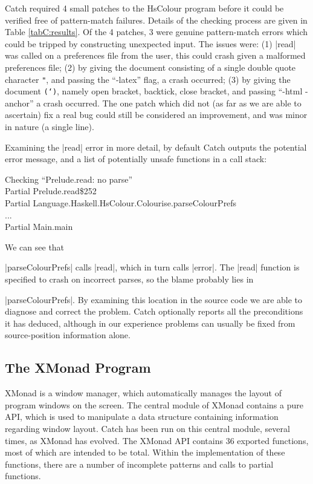 Catch required 4 small patches to the HsColour program before it could be verified free of pattern-match failures. Details of the checking process are given in Table \ref{tabC:results}. Of the 4 patches, 3 were genuine pattern-match errors which could be tripped by constructing unexpected input. The issues were: (1) |read| was called on a preferences file from the user, this could crash given a malformed preferences file; (2) by giving the document consisting of a single double quote character \texttt{"}, and passing the ``-latex'' flag, a crash occurred; (3) by giving the document \texttt{(`)}, namely open bracket, backtick, close bracket, and passing ``-html -anchor'' a crash occurred. The one patch which did not (as far as we are able to ascertain) fix a real bug could still be considered an improvement, and was minor in nature (a single line).

Examining the |read| error in more detail, by default Catch outputs the potential error message, and a list of potentially unsafe functions in a call stack:

\begin{console}
Checking ``Prelude.read: no parse'' \\
Partial Prelude.read\$252 \\
Partial Language.Haskell.HsColour.Colourise.parseColourPrefs \\
... \\
Partial Main.main
\end{console}

We can see that \ignore|parseColourPrefs| calls |read|, which in turn calls |error|. The |read| function is specified to crash on incorrect parses, so the blame probably lies in \ignore|parseColourPrefs|. By examining this location in the source code we are able to diagnose and correct the problem. Catch optionally reports all the preconditions it has deduced, although in our experience problems can usually be fixed from source-position information alone.

\subsection{The XMonad Program}
\label{secC:xmonad}

XMonad \cite{xmonad} is a window manager, which automatically manages the layout of program windows on the screen. The central module of XMonad contains a pure API, which is used to manipulate a data structure containing information regarding window layout. Catch has been run on this central module, several times, as XMonad has evolved. The XMonad API contains 36 exported functions, most of which are intended to be total. Within the implementation of these functions, there are a number of incomplete patterns and calls to partial functions.

